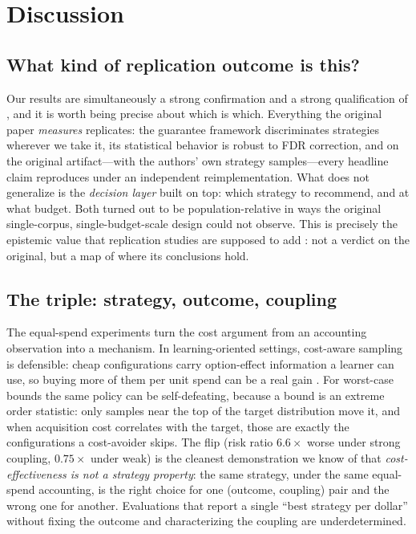\section{Discussion}
\label{sec:discussion}

\subsection{What kind of replication outcome is this?}

Our results are simultaneously a strong confirmation and a strong
qualification of \citet{weis2026risk}, and it is worth being precise
about which is which. Everything the original paper \emph{measures}
replicates: the guarantee framework discriminates strategies wherever we
take it, its statistical behavior is robust to FDR correction, and on the
original artifact---with the authors' own strategy samples---every
headline claim reproduces under an independent reimplementation. What
does not generalize is the \emph{decision layer} built on top: which
strategy to recommend, and at what budget. Both turned out to be
population-relative in ways the original single-corpus,
single-budget-scale design could not observe. This is precisely the
epistemic value that replication studies are supposed to add
\citep{shull2008role,gomez2014understanding}: not a verdict on the
original, but a map of where its conclusions hold.

\subsection{The triple: strategy, outcome, coupling}

The equal-spend experiments turn the cost argument from an accounting
observation into a mechanism. In learning-oriented settings, cost-aware
sampling is defensible: cheap configurations carry option-effect
information a learner can use, so buying more of them per unit spend can
be a real gain \citep{sarkar2015cost,nair2017bad}. For worst-case bounds
the same policy can be self-defeating, because a bound is an extreme
order statistic: only samples near the top of the target distribution
move it, and when acquisition cost correlates with the target, those are
exactly the configurations a cost-avoider skips. The \pilotcost{} flip
(risk ratio $6.6\times$ worse under strong coupling, $0.75\times$ under
weak) is the cleanest demonstration we know of that
\emph{cost-effectiveness is not a strategy property}: the same strategy,
under the same equal-spend accounting, is the right choice for one
(outcome, coupling) pair and the wrong one for another. Evaluations that
report a single ``best strategy per dollar'' without fixing the outcome
and characterizing the coupling are underdetermined.

